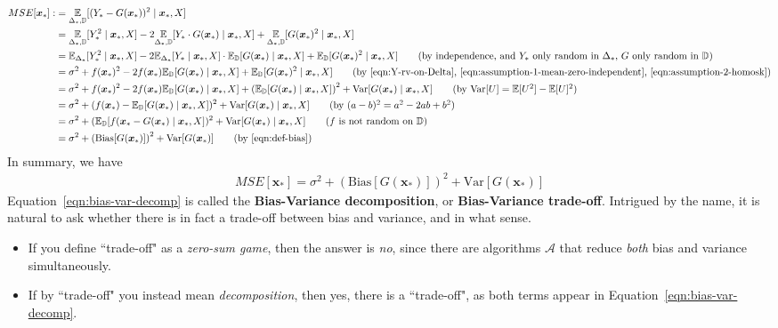 \documentclass[12pt, a4paper]{article}
\theoremstyle{definition}
\begin{document}
	\begin{align*}
		MSE[\bm{x}_*] :
		&= \underset{\Delta_*, \mathbb{D}}{\mathbb{E}}[(Y_* - G(\bm{x}_*))^2 \mid \bm{x}_*, X]\\
		&= \underset{\Delta_*, \mathbb{D}}{\mathbb{E}}[Y_*^2 \mid \bm{x}_*, X]
		- 2\underset{\Delta_*, \mathbb{D}}{\mathbb{E}}[Y_* \cdot G(\bm{x}_*)\mid \bm{x}_*, X]
		+\underset{\Delta_*, \mathbb{D}}{\mathbb{E}}[G(\bm{x}_*)^2\mid \bm{x}_*, X]\\
		&= \mathbb{E}_{\Delta_*}[Y_*^2 \mid \bm{x}_*, X]
		-2\mathbb{E}_{\Delta_*}[Y_*\mid \bm{x}_*, X]\cdot \mathbb{E}_{\mathbb{D}}[G(\bm{x}_*)\mid \bm{x}_*, X]
		+\mathbb{E}_{\mathbb{D}}[G(\bm{x}_*)^2\mid \bm{x}_*, X]
		\tag{by independence, and $Y_*$ only random in $\Delta_*$, $G$ only random in $\mathbb{D}$}\\
		&=\sigma^2 + f(\bm{x}_*)^2
		- 2f(\bm{x}_*)\mathbb{E}_{\mathbb{D}}[G(\bm{x}_*)\mid \bm{x}_*, X]
		+\mathbb{E}_{\mathbb{D}}[G(\bm{x}_*)^2\mid \bm{x}_*, X]
		\tag{by \ref{eqn:Y-rv-on-Delta}, \ref{eqn:assumption-1-mean-zero-independent},
		\ref{eqn:assumption-2-homosk}}\\
		&=\sigma^2 + f(\bm{x}_*)^2
		- 2f(\bm{x}_*)\mathbb{E}_{\mathbb{D}}[G(\bm{x}_*)\mid \bm{x}_*, X]
		+\left(\mathbb{E}_{\mathbb{D}}[G(\bm{x}_*)\mid \bm{x}_*, X]\right)^2
		+\text{Var}[G(\bm{x}_*)\mid \bm{x}_*, X]
		\tag{by $\text{Var}[U] = \mathbb{E}[U^2]- \mathbb{E}[U]^2$}\\
		&=\sigma^2 + (f(\bm{x}_*) - \mathbb{E}_{\mathbb{D}}[G(\bm{x}_*)\mid \bm{x}_*, X])^2
		+\text{Var}[G(\bm{x}_*)\mid \bm{x}_*, X]
		\tag{by $(a-b)^2=a^2-2ab+b^2$}\\
		&=\sigma^2 + (\mathbb{E}_{\mathbb{D}}[f(\bm{x}_* - G(\bm{x}_*)\mid \bm{x}_*, X])^2
		+\text{Var}[G(\bm{x}_*)\mid \bm{x}_*, X]
		\tag{$f$ is not random on $\mathbb{D}$}\\
		&=\sigma^2 + \left(\text{Bias}[G(\bm{x}_*)]\right)^2 + \text{Var}[G(\bm{x}_*)]
		\tag{by \ref{eqn:def-bias}}
	\end{align*}
	In summary, we have
	\begin{align}
		MSE[\bm{x}_*] =
		\sigma^2 + \left(\text{Bias}[G(\bm{x}_*)]\right)^2 + \text{Var}[G(\bm{x}_*)]
		\label{eqn:bias-var-decomp}
	\end{align}
	Equation~\ref{eqn:bias-var-decomp} is called the \textbf{Bias-Variance decomposition},
	or \textbf{Bias-Variance trade-off}. Intrigued by the name, it is natural to ask
	whether there is in fact a trade-off between bias and variance, and in what sense.
	\begin{itemize}
		\item If you define ``trade-off" as a \textit{zero-sum game}, then the answer
		is \textit{no}, since there are algorithms $\mathcal{A}$ that reduce \textit{both}
		bias and variance simultaneously.
		\item If by ``trade-off" you instead mean \textit{decomposition}, then yes,
		there is a ``trade-off", as both terms appear in Equation~\ref{eqn:bias-var-decomp}.
	\end{itemize}
\end{document}
